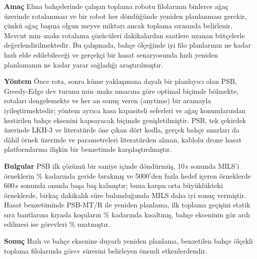 \textbf{Amaç} Elma bahçelerinde çalışan toplama robotu filolarının binlerce ağaç üzerinde
rotalanması ve bir robot her döndüğünde yeniden planlanması gerekir, çünkü ağaç başına olgun meyve
miktarı ancak toplama sırasında belirlenir. Mevcut min--maks rotalama çözücüleri
dakikalardan saatlere uzanan bütçelerle değerlendirilmektedir. Bu çalışmada, bahçe ölçeğinde iyi filo
planlarının ne kadar hızlı elde edilebileceği ve gerçekçi bir hasat senaryosunda hızlı yeniden planlamanın
ne kadar yarar sağladığı araştırılmıştır.

\textbf{Yöntem} Önce rota, sonra küme yaklaşımına dayalı bir planlayıcı olan PSB, Greedy-Edge dev turunu
min--maks amacına göre optimal biçimde bölmekte, rotaları dengelemekte ve her an sonuç veren (anytime)
bir aramayla iyileştirmektedir; yöntem ayrıca kasa kapasiteli seferleri ve ağaç konumlarından kestirilen
bahçe eksenini kapsayacak biçimde genişletilmiştir. PSB, tek çekirdek üzerinde LKH-3 ve literatürde öne çıkan
dört kodla, gerçek bahçe sınırları da dâhil \InstAll{} örnek üzerinde ve parametreleri
literatürden alınan, kablolu drone hasat platformlarına ilişkin bir benzetimde karşılaştırılmıştır.

\textbf{Bulgular} PSB ilk çözümü bir saniye içinde döndürmüş, 10\,s sonunda MILS'i örneklerin
\SotaMilsWinTenAll\% kadarında geride bırakmış ve 5000'den fazla hedef içeren örneklerde
600\,s sonunda onunla başa baş kalmıştır; buna karşın orta büyüklükteki örneklerde, birkaç dakikalık
süre bulunduğunda MILS daha iyi sonuç vermiştir. Hasat benzetiminde PSB-MT/R ile yeniden planlama, ilk toplama
geçişini statik sıra bantlarına kıyasla koşuların \HgFirstRowblockWin\% kadarında kısaltmış,
bahçe ekseninin göz ardı edilmesi ise görevleri
\HgFramePsbAxisZeroAbs\% uzatmıştır.

\textbf{Sonuç} Hızlı ve bahçe eksenine duyarlı yeniden planlama, benzetilen bahçe ölçekli
toplama filolarında görev süresini belirleyen önemli etkenlerdendir.
